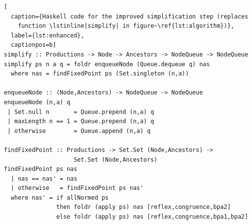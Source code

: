 \begin{lstlisting}[
  caption={Haskell code for the improved simplification step (replaces
    function \lstinline|simplify| in figure~\ref{lst:algorithm})},
  label={lst:enhanced},
  captionpos=b]
simplify :: Productions -> Node -> Ancestors -> NodeQueue -> NodeQueue
simplify ps n a q = foldr enqueueNode (Queue.dequeue q) nas
  where nas = findFixedPoint ps (Set.singleton (n,a))

enqueueNode :: (Node,Ancestors) -> NodeQueue -> NodeQueue
enqueueNode (n,a) q
 | Set.null n       = Queue.prepend (n,a) q
 | maxLength n == 1 = Queue.prepend (n,a) q
 | otherwise        = Queue.append (n,a) q

findFixedPoint :: Productions -> Set.Set (Node,Ancestors) -> 
                    Set.Set (Node,Ancestors)
findFixedPoint ps nas
  | nas == nas' = nas
  | otherwise   = findFixedPoint ps nas'
  where nas' = if allNormed ps
               then foldr (apply ps) nas [reflex,congruence,bpa2]
               else foldr (apply ps) nas [reflex,congruence,bpa1,bpa2]
\end{lstlisting}



